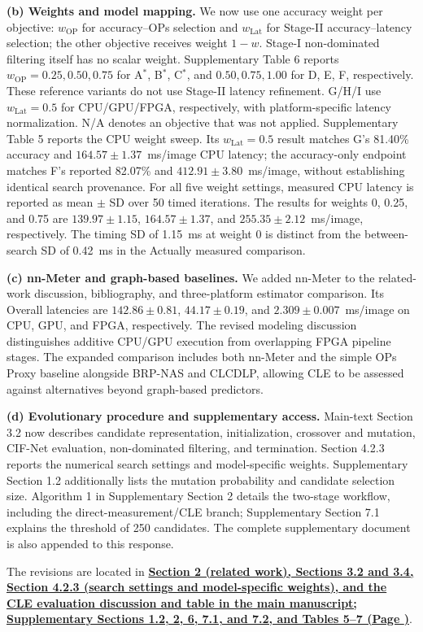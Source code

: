 \documentclass[11pt]{article}
\newcommand{\finishresponse}{\par\color{black}\vspace{5mm}}
\newcommand{\revloc}[1]{%
  \textcolor{revisionred}{\textbf{\uline{#1}}}}
\begin{document}
\begin{enumerate}[leftmargin=0pt,label={},itemsep=5mm]
\textbf{(b) Weights and model mapping.} We now use one accuracy weight per objective: $w_{\mathrm{OP}}$ for accuracy--OPs selection and $w_{\mathrm{Lat}}$ for Stage-II accuracy--latency selection; the other objective receives weight $1-w$. Stage-I non-dominated filtering itself has no scalar weight. Supplementary Table 6 reports $w_{\mathrm{OP}}=0.25,0.50,0.75$ for A$^*$, B$^*$, C$^*$, and $0.50,0.75,1.00$ for D, E, F, respectively. These reference variants do not use Stage-II latency refinement. G/H/I use $w_{\mathrm{Lat}}=0.5$ for CPU/GPU/FPGA, respectively, with platform-specific latency normalization. N/A denotes an objective that was not applied. Supplementary Table 5 reports the CPU weight sweep. Its $w_{\mathrm{Lat}}=0.5$ result matches G's 81.40\% accuracy and $164.57\pm1.37$~ms/image CPU latency; the accuracy-only endpoint matches F's reported 82.07\% and $412.91\pm3.80$~ms/image, without establishing identical search provenance. For all five weight settings, measured CPU latency is reported as mean $\pm$ SD over 50 timed iterations. The results for weights 0, 0.25, and 0.75 are $139.97\pm1.15$, $164.57\pm1.37$, and $255.35\pm2.12$~ms/image, respectively. The timing SD of 1.15~ms at weight 0 is distinct from the between-search SD of 0.42~ms in the Actually measured comparison.

\textbf{(c) nn-Meter and graph-based baselines.} We added nn-Meter to the related-work discussion, bibliography, and three-platform estimator comparison. Its Overall latencies are $142.86\pm0.81$, $44.17\pm0.19$, and $2.309\pm0.007$~ms/image on CPU, GPU, and FPGA, respectively. The revised modeling discussion distinguishes additive CPU/GPU execution from overlapping FPGA pipeline stages. The expanded comparison includes both nn-Meter and the simple OPs Proxy baseline alongside BRP-NAS and CLCDLP, allowing CLE to be assessed against alternatives beyond graph-based predictors.

\textbf{(d) Evolutionary procedure and supplementary access.} Main-text Section 3.2 now describes candidate representation, initialization, crossover and mutation, CIF-Net evaluation, non-dominated filtering, and termination. Section 4.2.3 reports the numerical search settings and model-specific weights. Supplementary Section 1.2 additionally lists the mutation probability and candidate selection size. Algorithm 1 in Supplementary Section 2 details the two-stage workflow, including the direct-measurement/CLE branch; Supplementary Section 7.1 explains the threshold of 250 candidates. The complete supplementary document is also appended to this response.

The revisions are located in \revloc{Section 2 (related work), Sections 3.2 and 3.4, Section 4.2.3 (search settings and model-specific weights), and the CLE evaluation discussion and table in the main manuscript; Supplementary Sections 1.2, 2, 6, 7.1, and 7.2, and Tables 5--7 (Page \underline{\hspace{1cm}})}.
\par\endgroup
\finishresponse
\end{enumerate}
\end{document}
